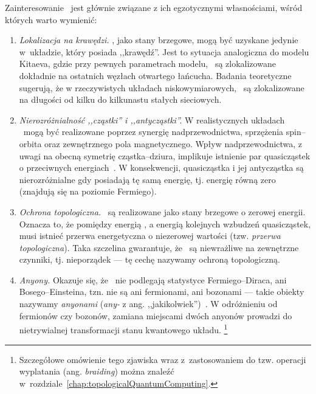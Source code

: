 Zainteresowanie \MZM\ jest głównie związane z ich egzotycznymi własnościami, wśród których warto  wymienić:
\begin{enumerate}

\item \textit{Lokalizacja na krawędzi.}
\MZM, jako stany brzegowe, mogą być uzyskane jedynie w~układzie, który posiada ,,krawędź''.
Jest to sytuacja analogiczna do modelu Kitaeva, gdzie przy pewnych parametrach modelu, \MZM\ są zlokalizowane dokładnie na ostatnich węzłach otwartego łańcucha.
Badania teoretyczne sugerują, że w rzeczywistych układach niskowymiarowych, \MZM\ są zlokalizowane na długości od kilku do kilkunastu stałych sieciowych.

\item \textit{Nierozróżnialność ,,cząstki'' i ,,antycząstki''.}
W realistycznych układach \MZM\ mogą być realizowane poprzez synergię nadprzewodnictwa, sprzężenia spin--orbita oraz zewnętrznego pola magnetycznego.
Wpływ nadprzewodnictwa, z uwagi na obecną symetrię cząstka--dziura, implikuje istnienie par quasicząstek o przeciwnych energiach~\cite{wilczek.2009,chamon.jackiw.2010,leijnse.flensberg.2012,beenakker.2014,sato.yoichi.2017}.
W konsekwencji, quasicząstka i jej antycząstka są nierozróżnialne gdy posiadają tę samą energię, tj. energię równą zero (znajdują się na poziomie Fermiego).

\item \textit{Ochrona topologiczna.}
\MZM\ są realizowane jako stany brzegowe o zerowej energii.
Oznacza to, że pomiędzy energią \MZM, a energią kolejnych wzbudzeń quasicząstek, musi istnieć przerwa energetyczna o niezerowej wartości (tzw. {\it przerwa topologiczna}).
Taka szczelina gwarantuje, że \MZM\ są niewrażliwe na zewnętrzne czynniki, tj. nieporządek --- tę cechę nazywamy ochroną topologiczną.

\item \textit{Anyony.}
Okazuje się, że \MZM\ nie podlegają statystyce Fermiego--Diraca, ani Bosego--Einsteina, tzn. nie są ani fermionami, ani bozonami --- takie obiekty nazywamy {\it anyonami} ({\it any-} z ang. ,,jakikolwiek'')~\cite{read.green.2000,ivanov.2001,nayak.simon.2008,lahtinen.pachos.2017}.
W odróżnieniu od fermionów czy bozonów, zamiana miejscami dwóch anyonów prowadzi do nietrywialnej transformacji stanu kwantowego układu.%
\footnote{Szczegółowe omówienie tego zjawiska wraz z~zastosowaniem do tzw. operacji wyplatania (ang. \textit{braiding})  można znaleźć w~rozdziale~\ref{chap:topologicalQuantumComputing}.}


\end{enumerate}
